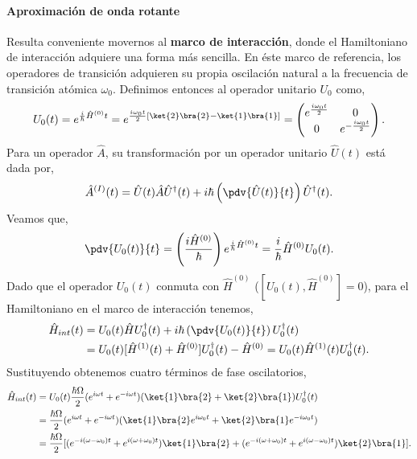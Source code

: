 \paragraph{Aproximación de onda rotante}
Resulta conveniente movernos al \textbf{marco de interacción}, donde el Hamiltoniano de interacción adquiere una forma más sencilla. En éste marco de referencia, los operadores de transición adquieren su propia oscilación natural a la frecuencia de transición atómica $\omega_0$. Definimos entonces al operador unitario $U_0$ como,
\begin{equation}
    U_0(t) = e^{\frac{i}{\hbar} \hat{H}^{(0)} t} = e^{\frac{i \omega_0 t}{2} \left[ \ket{2}\bra{2}-\ket{1}\bra{1}\right]} = \begin{pmatrix}
    e^{\frac{i \omega_0 t}{2}} & 0 \\
    0 & e^{-\frac{i \omega_0 t}{2}}
    \end{pmatrix}.
\end{equation}
Para un operador $\hat{A}$, su transformación por un operador unitario $\hat{U}(t)$ está dada por,
\begin{equation}
    \hat{A}^{(I)}(t) = \hat{U}(t) \hat{A} \hat{U}^{\dagger}(t) + i \hbar \left(\pdv{\hat{U}(t)}{t}\right) \hat{U}^{\dagger}(t).
\end{equation}
Veamos que, 
\begin{equation}
    \pdv{U_0(t)}{t} = \left(\frac{i \hat{H}^{(0)}}{\hbar} \right) e^{\frac{i}{\hbar} \hat{H}^{(0)} t} = \frac{i}{\hbar} \hat{H}^{(0)} U_0(t).
\end{equation}
Dado que el operador $U_0(t)$ conmuta con $\hat{H}^{(0)}$ ($[U_0(t), \hat{H}^{(0)}] = 0$), para el Hamiltoniano en el marco de interacción tenemos,
\begin{equation}
\begin{split}
    \hat{H}_{int} (t)&= U_0(t) \hat{H} U_0^{\dagger}(t) + i \hbar \left(\pdv{U_0(t)}{t}\right) U_0^{\dagger}(t)\\
    &= U_0(t) [\hat{H}^{(1)}(t)+ \hat{H}^{(0)} ] U_0^{\dagger}(t)  - \hat{H}^{(0)} 
    = U_0(t) \hat{H}^{(1)}(t) U_0^{\dagger}(t).
\end{split}
\end{equation}
Sustituyendo obtenemos cuatro términos de fase oscilatorios,
\begin{equation}
\begin{split}
    \hat{H}_{int} (t) &= U_0(t) \frac{\hbar \Omega}{2} (e^{i \omega t} + e^{-i \omega t})(\ket{1}\bra{2} + \ket{2}\bra{1}) U_0^{\dagger}(t)\\
    &= \frac{\hbar \Omega}{2} (e^{i \omega t} + e^{-i \omega t})(\ket{1}\bra{2} e^{i \omega_0 t} + \ket{2}\bra{1} e^{-i \omega_0 t})\\
    &= \frac{\hbar \Omega}{2} [(e^{-i (\omega - \omega_0) t} + e^{i (\omega + \omega_0) t}) \ket{1}\bra{2} + (e^{-i (\omega + \omega_0) t}  + e^{i (\omega - \omega_0) t}) \ket{2}\bra{1}].
\end{split}
\end{equation}
